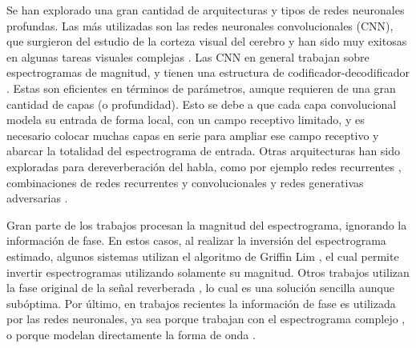 Se han explorado una gran cantidad de arquitecturas y tipos de redes neuronales profundas. Las más utilizadas son las redes neuronales convolucionales (CNN), que surgieron del estudio de la corteza visual del cerebro y han sido muy exitosas en algunas tareas visuales complejas \cite{lagartija}.  Las CNN en general trabajan sobre espectrogramas de magnitud, y tienen una estructura de codificador-decodificador \cite{FCN, rir_filtinverso}. Estas son eficientes en términos de parámetros, aunque requieren de una gran cantidad de capas (o profundidad). Esto se debe a que cada capa convolucional modela su entrada de forma local, con un campo receptivo limitado, y es necesario colocar muchas capas en serie para ampliar ese campo receptivo y abarcar la totalidad del espectrograma de entrada. Otras arquitecturas han sido exploradas para dereverberación del habla, como por ejemplo redes recurrentes \cite{RNN}, combinaciones de redes recurrentes y convolucionales \cite{RNN+CNN} y redes generativas adversarias \cite{GAN}.


Gran parte de los trabajos procesan la magnitud del espectrograma, ignorando la información de fase. En estos casos, al realizar la inversión del espectrograma estimado, algunos sistemas \cite{ezeKun} utilizan el algoritmo de Griffin Lim \cite{griffinlim}, el cual permite invertir espectrogramas utilizando solamente su magnitud. Otros trabajos utilizan la fase original de la señal reverberada \cite{CNN, FCN, skip, rir_filtinverso}, lo cual es una solución sencilla aunque subóptima. Por último, en trabajos recientes la información de fase es utilizada por las redes neuronales, ya sea porque trabajan con el espectrograma complejo \cite{cIRM}, o porque modelan directamente la forma de onda \cite{hifiGAN}.